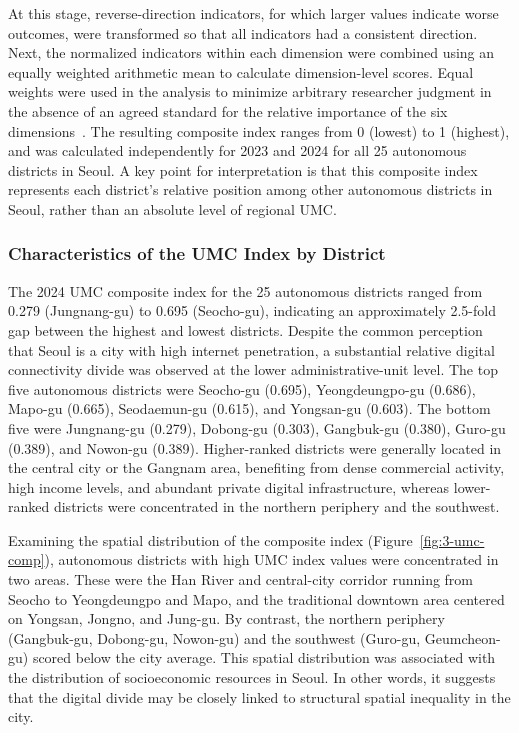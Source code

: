 At this stage, reverse-direction indicators, for which larger values indicate worse outcomes, were transformed so that all indicators had a consistent direction. Next, the normalized indicators within each dimension were combined using an equally weighted arithmetic mean to calculate dimension-level scores. Equal weights were used in the analysis to minimize arbitrary researcher judgment in the absence of an agreed standard for the relative importance of the six dimensions~\citep{ITU2024}. The resulting composite index ranges from 0 (lowest) to 1 (highest), and was calculated independently for 2023 and 2024 for all 25 autonomous districts in Seoul. A key point for interpretation is that this composite index represents each district's relative position among other autonomous districts in Seoul, rather than an absolute level of regional UMC.

\subsubsection{Characteristics of the UMC Index by District}
\label{subsubsec:3-1-3}

The 2024 UMC composite index for the 25 autonomous districts ranged from 0.279 (Jungnang-gu) to 0.695 (Seocho-gu), indicating an approximately 2.5-fold gap between the highest and lowest districts. Despite the common perception that Seoul is a city with high internet penetration, a substantial relative digital connectivity divide was observed at the lower administrative-unit level. The top five autonomous districts were Seocho-gu (0.695), Yeongdeungpo-gu (0.686), Mapo-gu (0.665), Seodaemun-gu (0.615), and Yongsan-gu (0.603). The bottom five were Jungnang-gu (0.279), Dobong-gu (0.303), Gangbuk-gu (0.380), Guro-gu (0.389), and Nowon-gu (0.389). Higher-ranked districts were generally located in the central city or the Gangnam area, benefiting from dense commercial activity, high income levels, and abundant private digital infrastructure, whereas lower-ranked districts were concentrated in the northern periphery and the southwest.

Examining the spatial distribution of the composite index (Figure~\ref{fig:3-umc-comp}), autonomous districts with high UMC index values were concentrated in two areas. These were the Han River and central-city corridor running from Seocho to Yeongdeungpo and Mapo, and the traditional downtown area centered on Yongsan, Jongno, and Jung-gu. By contrast, the northern periphery (Gangbuk-gu, Dobong-gu, Nowon-gu) and the southwest (Guro-gu, Geumcheon-gu) scored below the city average. This spatial distribution was associated with the distribution of socioeconomic resources in Seoul. In other words, it suggests that the digital divide may be closely linked to structural spatial inequality in the city.

